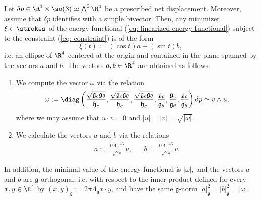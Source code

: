 \begin{theorem}
\label{thm:optimal control curves in the simple case}
Let $\delta p \in \R^3 \times \so(3) \simeq \bigwedge^2 \R^4$ be a prescribed net displacement. Moreover, assume that $\delta p$ identifies with a simple bivector. Then, any minimizer $\xi \in \strokes$ of the energy functional (\ref{eq: linearized energy functional}) subject to the constraint (\ref{eq: constraint}) is of the form
\begin{equation}
\xi(t) := (\cos t) a + (\sin t) b,
\end{equation}
i.e. an ellipse of $\R^4$ centered at the origin and contained in the plane spanned by the vectors $a$ and $b$. The vectors $a,b \in \R^4$ are obtained as follows:
\begin{enumerate}
\item We compute the vector $\omega$ via the relation
\begin{equation}
\omega := \diag \left (\frac{\sqrt{\mathfrak{g}_c \mathfrak{g}_{\theta}}}{\mathfrak{h}_c}, \frac{\sqrt{\mathfrak{g}_c \mathfrak{g}_{\theta}}}{\mathfrak{h}_c}, \frac{\sqrt{\mathfrak{g}_c \mathfrak{g}_{\theta}}}{\mathfrak{h}_c}, \frac{\mathfrak{g}_c}{\mathfrak{g}_\theta}, \frac{\mathfrak{g}_c}{\mathfrak{g}_\theta}, \frac{\mathfrak{g}_c}{\mathfrak{g}_\theta} \right ) \delta p \simeq v \wedge u,
\end{equation}
where we may assume that $u \cdot v = 0$ and $|u| = |v| = \sqrt{|\omega|}$.

\item We calculate the vectors $a$ and $b$ via the relations
\begin{equation}
\label{eq:global minimizer form}
\begin{aligned}
a := \frac{U \Lambda_{\mathfrak{g}}^{-1/2}}{\sqrt{2 \pi}} u,&& b := \frac{U \Lambda_{\mathfrak{g}}^{-1/2}}{\sqrt{2 \pi}} v.
\end{aligned}
\end{equation}
\end{enumerate}

In addition, the minimal value of the energy functional is $|\omega|$, and the vectors $a$ and $b$ are $\mathfrak{g}$-orthogonal, i.e. with respect to the inner product defined for every $x,y \in \R^4$ by $(x, y)_{\mathfrak{g}} := 2 \pi \Lambda_{\mathfrak{g}} x \cdot y$, and have the same $\mathfrak{g}$-norm $|a|_{\mathfrak{g}}^2 = |b|_{\mathfrak{g}}^2 = |\omega|$. 
\end{theorem}


